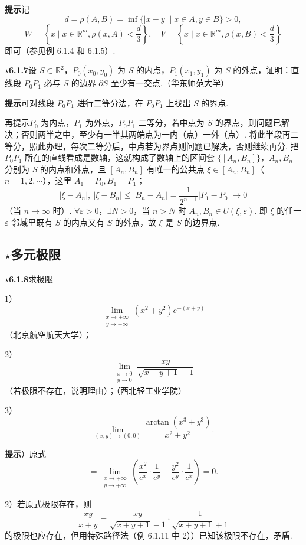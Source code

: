 \documentclass[UTF8, 12pt, fontset=fandol, oneside]{ctexart}
\begin{document}
\noindent\textbf{提示}\quad 记
\[
  d=\rho(A,B)=\inf\{|x-y|\mid x\in A,y\in B\}>0,
\]
\[
  W=\left\{x\mid x\in\mathbb{R}^m,\rho(x,A)<\frac d3\right\},\quad
  V=\left\{x\mid x\in\mathbb{R}^m,\rho(x,B)<\frac d3\right\}
\]
即可（参见例 6.1.4 和 6.1.5）.

\noindent\textbf{$\star$6.1.7}\quad 设 $S\subset\mathbb{R}^2$，$P_0(x_0,y_0)$ 为 $S$ 的内点，$P_1(x_1,y_1)$ 为 $S$ 的外点，证明：直线段 $P_0P_1$ 必与 $S$ 的边界 $\partial S$ 至少有一交点.（华东师范大学）

\noindent\textbf{提示}\quad 可对线段 $P_0P_1$ 进行二等分法，在 $P_0P_1$ 上找出 $S$ 的界点.

再提示\quad $P_0$ 为内点，$P_1$ 为外点，$P_0P_1$ 二等分，若中点为 $S$ 的界点，则问题已解决；否则两半之中，至少有一半其两端点为一内（点）一外（点）. 将此半段再二等分，照此办理，每次二等分后，中点若为界点则问题已解决，否则继续再分. 把 $P_0P_1$ 所在的直线看成是数轴，这就构成了数轴上的区间套 $\{[A_n,B_n]\}$，$A_n,B_n$ 分别为 $S$ 的内点和外点，且 $[A_n,B_n]$ 有唯一的公共点 $\xi\in[A_n,B_n]$（$n=1,2,\cdots$），这里 $A_1=P_0,B_1=P_1$；
\[
  |\xi-A_n|,\ |\xi-B_n|\le |B_n-A_n|
  =\frac1{2^{n-1}}|P_1-P_0|\to0
\]
（当 $n\to\infty$ 时）. $\forall\varepsilon>0$，$\exists N>0$，当 $n>N$ 时 $A_n,B_n\in U(\xi,\varepsilon)$. 即 $\xi$ 的任一 $\varepsilon$ 邻域里既有 $S$ 的内点又有 $S$ 的外点，故 $\xi$ 是 $S$ 的边界点.

\subsection*{$\star$多元极限}

\noindent\textbf{$\star$6.1.8}\quad 求极限

1）
\[
  \lim_{\substack{x\to+\infty\\ y\to+\infty}}(x^2+y^2)e^{-(x+y)}
\]
（北京航空航天大学）；

2）
\[
  \lim_{\substack{x\to0\\ y\to0}}\frac{xy}{\sqrt{x+y+1}-1}
\]
（若极限不存在，说明理由）；（西北轻工业学院）

3）
\[
  \lim_{(x,y)\to(0,0)}\frac{\arctan(x^3+y^3)}{x^2+y^2}.
\]

\noindent\textbf{提示}）原式
\[
  =\lim_{\substack{x\to+\infty\\ y\to+\infty}}
  \left(\frac{x^2}{e^x}\cdot\frac1{e^y}
  +\frac{y^2}{e^y}\cdot\frac1{e^x}\right)=0.
\]

2）若原式极限存在，则
\[
  \frac{xy}{x+y}
  =\frac{xy}{\sqrt{x+y+1}-1}\cdot\frac1{\sqrt{x+y+1}+1}
\]
的极限也应存在，但用特殊路径法（例 6.1.11 中 2））已知该极限不存在，矛盾.
\end{document}
